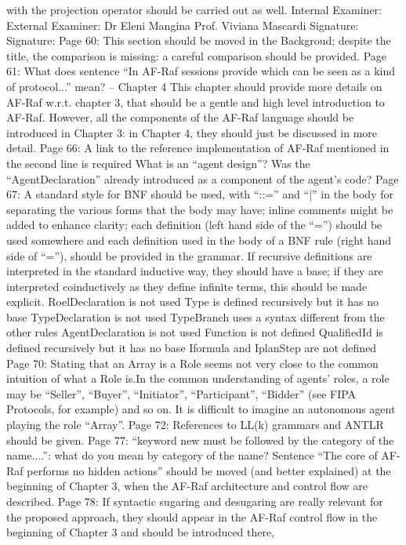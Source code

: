 \documentclass{article}
\newenvironment{them}{\noindent\begingroup\color{blue}}{\endgroup\par}
\begin{document}
\begin{them}
with the projection operator should be carried out as well.
Internal Examiner: External Examiner:
Dr Eleni Mangina Prof. Viviana Mascardi
Signature: Signature:
Page 60:
This section should be moved in the Backgroud; despite the title, the comparison is missing: a careful
comparison should be provided.
Page 61:
What does sentence “In AF-Raf sessions provide which can be seen as a kind of protocol...” mean?
-- Chapter 4
This chapter should provide more details on AF-Raf w.r.t. chapter 3, that should be a gentle and high
level introduction to AF-Raf. However, all the components of the AF-Raf language should be
introduced in Chapter 3: in Chapter 4, they should just be discussed in more detail.
Page 66:
A link to the reference implementation of AF-Raf mentioned in the second line is required
What is an “agent design”? Was the “AgentDeclaration” already introduced as a component of the
agent's code?
Page 67:
A standard style for BNF should be used, with “::=” and “|” in the body for separating the various
forms that the body may have; inline comments might be added to enhance clarity; each definition
(left hand side of the “=”) should be used somewhere and each definition used in the body of a BNF
rule (right hand side of “=”), should be provided in the grammar. If recursive definitions are
interpreted in the standard inductive way, they should have a base; if they are interpreted
coinductively as they define infinite terms, this should be made explicit.
RoelDeclaration is not used
Type is defined recursively but it has no base
TypeDeclaration is not used
TypeBranch uses a syntax different from the other rules
AgentDeclaration is not used
Function is not defined
QualifiedId is defined recursively but it has no base
Iformula and IplanStep are not defined
Page 70:
Stating that an Array is a Role seems not very close to the common intuition of what a Role is.In the
common understanding of agents' roles, a role may be “Seller”, “Buyer”, “Initiator”, “Participant”,
“Bidder” (see FIPA Protocols, for example) and so on. It is difficult to imagine an autonomous agent
playing the role “Array”.
Page 72:
References to LL(k) grammars and ANTLR should be given.
Page 77:
“keyword new must be followed by the category of the name....”: what do you mean by category of
the name?
Sentence “The core of AF-Raf performs no hidden actions” should be moved (and better explained)
at the beginning of Chapter 3, when the AF-Raf architecture and control flow are described.
Page 78:
If syntactic sugaring and desugaring are really relevant for the proposed approach, they should
appear in the AF-Raf control flow in the beginning of Chapter 3 and should be introduced there,

\end{them}
\end{document}
